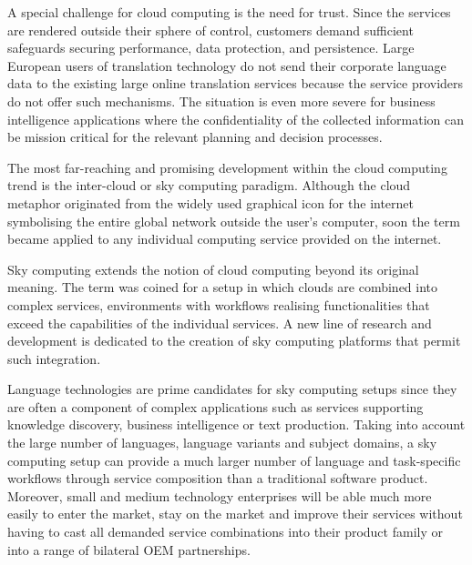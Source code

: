 \documentclass[10pt, plain]{../../metanetpaper}
\begin{document}
\begin{multicols}{2}
A special challenge for cloud computing is the need for trust. Since the services are rendered outside their sphere of control, customers demand sufficient safeguards securing performance, data protection, and persistence. Large European users of translation technology do not send their corporate language data to the existing large online translation services because the service providers do not offer such mechanisms. The situation is even more severe for business intelligence applications where the confidentiality of the collected information can be mission critical for the relevant planning and decision processes.  

The most far-reaching and promising development within the cloud computing trend is the inter-cloud or sky computing paradigm. Although the cloud metaphor originated from the widely used graphical icon for the internet symbolising the entire global network outside the user’s computer, soon the term became applied to any individual computing service provided on the internet.  

Sky computing extends the notion of cloud computing beyond its original meaning. The term was coined for a setup in which clouds are combined into complex services, environments with workflows realising functionalities that exceed the capabilities of the individual services. A new line of research and development is dedicated to the creation of sky computing platforms that permit such integration.

Language technologies are prime candidates for sky computing setups since they are often a component of complex applications such as services supporting knowledge discovery, business intelligence or text production. Taking into account the large number of languages, language variants and subject domains, a sky computing setup can provide a much larger number of language and task-specific workflows through service composition than a traditional software product. Moreover, small and medium technology enterprises will be able much more easily to enter the market, stay on the market and improve their services without having to cast all demanded service combinations into their product family or into a range of bilateral OEM partnerships.
\end{multicols}

\clearpage


\label{sec:lwp}
\end{document}
